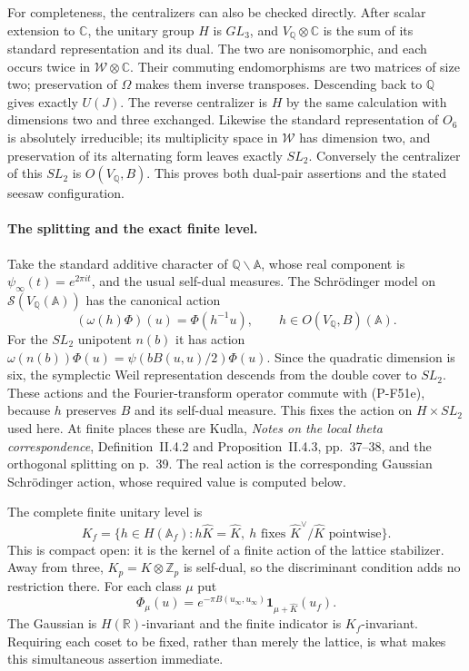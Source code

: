 For completeness, the centralizers can also be checked
directly. After scalar extension to $\mathbb C$, the
unitary group $H$ is $GL_3$, and $V_{\mathbb Q}\otimes\mathbb C$
is the sum of its standard representation and its dual.
The two are nonisomorphic, and each occurs twice in
$\mathcal W\otimes\mathbb C$. Their commuting
endomorphisms are two matrices of size two; preservation
of $\Omega$ makes them inverse transposes. Descending
back to $\mathbb Q$ gives exactly $U(J)$.
The reverse centralizer is $H$ by the same calculation
with dimensions two and three exchanged. Likewise the
standard representation of $O_6$ is absolutely irreducible;
its multiplicity space in $\mathcal W$ has dimension two,
and preservation of its alternating form leaves exactly
$SL_2$. Conversely the centralizer of this $SL_2$ is
$O(V_{\mathbb Q},B)$. This proves both dual-pair assertions
and the stated seesaw configuration.

\paragraph{The splitting and the exact finite level.}
Take the standard additive character of
$\mathbb Q\backslash\mathbb A$, whose real component is
$\psi_\infty(t)=e^{2\pi it}$, and the usual self-dual
measures. The Schr\"odinger model on
$\mathcal S(V_{\mathbb Q}(\mathbb A))$ has the canonical
action
\[
        (\omega(h)\Phi)(u)=\Phi(h^{-1}u),
                   \qquad h\in O(V_{\mathbb Q},B)(\mathbb A).
 \tag{P-F51e}
\]
For the $SL_2$ unipotent $n(b)$ it has action
$\omega(n(b))\Phi(u)=\psi(bB(u,u)/2)\Phi(u)$.
Since the quadratic dimension is six, the symplectic
Weil representation descends from the double cover
to $SL_2$. These actions and the Fourier-transform
operator commute with (P-F51e), because $h$ preserves
$B$ and its self-dual measure. This fixes the action
on $H\times SL_2$ used here. At finite places these are
Kudla, \emph{Notes on the local theta correspondence},
Definition~II.4.2 and Proposition~II.4.3, pp.~37--38,
and the orthogonal splitting on p.~39. The real action
is the corresponding Gaussian Schr\"odinger action,
whose required value is computed below.

The complete finite unitary level is
\[
 K_f=\{h\in H(\mathbb A_f):h\widehat K=\widehat K,
                  \ h\text{ fixes }\widehat K^\vee/\widehat K
                          \text{ pointwise}\}.
 \tag{P-F51f}
\]
This is compact open: it is the kernel of a finite
action of the lattice stabilizer. Away from three,
$K_p=K\otimes\mathbb Z_p$ is self-dual, so the discriminant condition
adds no restriction there. For each class $\mu$ put
\[
 \Phi_\mu(u)=e^{-\pi B(u_\infty,u_\infty)}
                 \mathbf1_{\mu+\widehat K}(u_f).
 \tag{P-F51g}
\]
The Gaussian is $H(\mathbb R)$-invariant and the
finite indicator is $K_f$-invariant. Requiring each
coset to be fixed, rather than merely the lattice,
is what makes this simultaneous assertion immediate.

